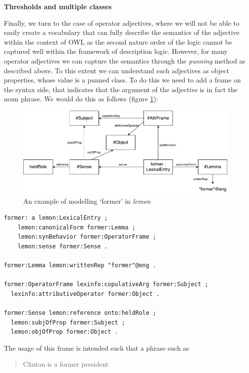 \documentclass[11pt]{article}
\begin{document}
\textbf{Thresholds and multiple classes}

Finally, we turn to the case of operator adjectives, where we will not be able to easily create a vocabulary that can fully describe the semantics of the adjective within the context of OWL as the second nature order of the logic cannot be captured well within the framework of description logic. However, for many operator adjectives we can capture the semantics through the \emph{punning} method as described above. To this extent we can understand such adjectives as object properties, whose value is a punned class. To do this we need to add a frame on the syntax side, that indicates that the argument of the adjective is in fact the noun phrase. We would do this as follows (figure \ref{former-example}):

\begin{figure}
\includegraphics[width=\textwidth]{former-example}
\caption{An example of modelling `former' in \emph{lemon}\label{former-example}}
\end{figure}

\begin{verbatim}
former: a lemon:LexicalEntry ;
	lemon:canonicalForm former:Lemma ;
	lemon:synBehavior former:OperatorFrame ;
	lemon:sense former:Sense .

former:Lemma lemon:writtenRep "former"@eng .

former:OperatorFrame lexinfo:copulativeArg former:Subject ;
  lexinfo:attributiveOperator former:Object .
  
former:Sense lemon:reference onto:heldRole ;
  lemon:subjOfProp former:Subject ;
  lemon:objOfProp former:Object .
\end{verbatim}

The usage of this frame is intended such that a phrase such as

\begin{quote}
Clinton is a former president
\end{quote}
\end{document}

